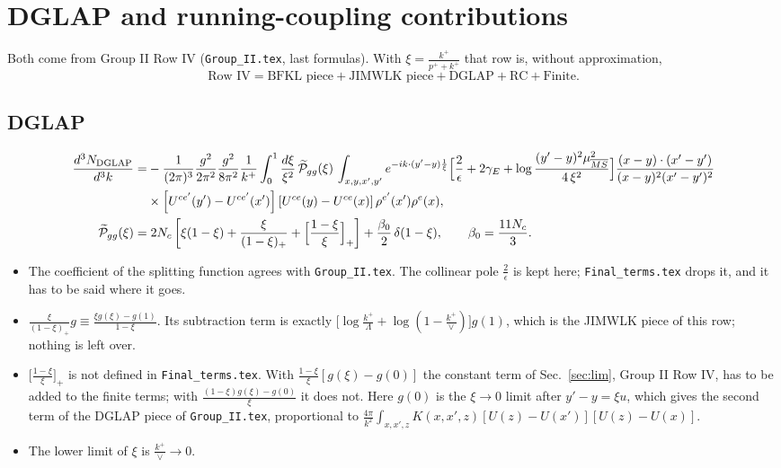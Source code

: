 \documentclass[9pt]{article}
\numberwithin{equation}{section}
\begin{document}
\section{DGLAP and running-coupling contributions}\label{sec:dglap}
Both come from Group II Row IV (\texttt{Group\_II.tex}, last formulas). With $\xi=\frac{k^{+}}{p^{+}+k^{+}}$ that row is, without approximation,
\[
\text{Row IV}=\text{BFKL piece}+\text{JIMWLK piece}+\text{DGLAP}+\text{RC}+\text{Finite}.
\]
\subsection{DGLAP}
\begin{align}
\frac{d^{3}N_{\rm DGLAP}}{d^{3}k}= &-\frac{1}{(2\pi)^{3}}\frac{g^{2}}{2\pi^{2}}\frac{g^{2}}{8\pi^{2}}\frac{1}{k^{+}}\int_{0}^{1}\frac{d\xi}{\xi^{2}}\,\widetilde{\mathcal P}_{gg}(\xi)\,\int_{x,y,x',y'}e^{-ik\cdot(y'-y)\frac{1}{\xi}}\Big[\frac{2}{\epsilon}+2\gamma_{E}+\log\frac{(y'-y)^{2}\mu^{2}_{\overline{MS}}}{4\,\xi^{2}}\Big]\frac{(x-y)\cdot(x'-y')}{(x-y)^{2}(x'-y')^{2}}\notag\\
&\times\left[U^{ce'}(y') - U^{ce'}(x')\right]\left[U^{ce}(y) - U^{ce}(x)\right]\rho^{e'}(x')\rho^{e}(x),\\
\widetilde{\mathcal{P}}_{gg}(\xi) =&\; 2N_{c}\left[\xi(1-\xi) + \frac{\xi}{(1-\xi)_{+}} + \Big[\frac{1-\xi}{\xi}\Big]_{+}\right]+\frac{\beta_{0}}{2}\,\delta(1-\xi),\qquad \beta_{0}=\frac{11N_{c}}{3}.\notag
\end{align}
\begin{itemize}
\item The coefficient of the splitting function agrees with \texttt{Group\_II.tex}. The collinear pole $\frac{2}{\epsilon}$ is kept here; \texttt{Final\_terms.tex} drops it, and it has to be said where it goes.
\item $\frac{\xi}{(1-\xi)_{+}}g\equiv\frac{\xi g(\xi)-g(1)}{1-\xi}$. Its subtraction term is exactly $\big[\log\frac{k^{+}}{\Lambda}+\log(1-\frac{k^{+}}{\vee})\big]g(1)$, which is the JIMWLK piece of this row; nothing is left over.
\item $\big[\frac{1-\xi}{\xi}\big]_{+}$ is not defined in \texttt{Final\_terms.tex}. With $\frac{1-\xi}{\xi}[g(\xi)-g(0)]$ the constant term of Sec.~\ref{sec:lim}, Group II Row IV, has to be added to the finite terms; with $\frac{(1-\xi)g(\xi)-g(0)}{\xi}$ it does not. Here $g(0)$ is the $\xi\to0$ limit after $y'-y=\xi u$, which gives the second term of the DGLAP piece of \texttt{Group\_II.tex}, proportional to $\frac{4\pi}{k^{2}}\int_{x,x',z}K(x,x',z)[U(z)-U(x')][U(z)-U(x)]$.
\item The lower limit of $\xi$ is $\frac{k^{+}}{\vee}\to0$.
\end{itemize}
\end{document}
